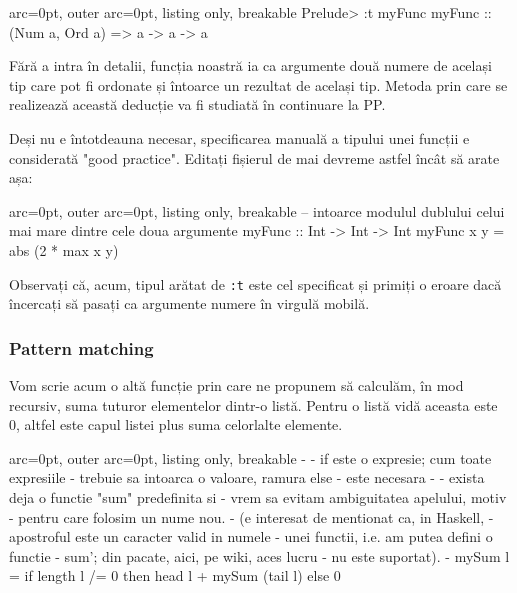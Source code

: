 \begin{tcblisting}{ arc=0pt, outer arc=0pt, listing only, breakable}
Prelude> :t myFunc
myFunc :: (Num a, Ord a) => a -> a -> a

\end{tcblisting}


Fără a intra în detalii, funcția noastră ia ca argumente două numere de același tip care pot fi ordonate și întoarce un rezultat de același tip. Metoda prin care se realizează această deducție va fi studiată în continuare la PP.

\begin{tcolorbox}[colback=blue!10, colframe=blue!20]
Deși nu e întotdeauna necesar, specificarea manuală a tipului unei funcții e considerată "good practice". Editați fișierul de mai devreme astfel încât să arate așa:


\begin{tcblisting}{ arc=0pt, outer arc=0pt, listing only, breakable}
-- intoarce modulul dublului celui mai mare dintre cele doua argumente
myFunc :: Int -> Int -> Int
myFunc x y = abs (2 * max x y)

\end{tcblisting}


Observați că, acum, tipul arătat de \texttt{:t} este cel specificat și primiți o eroare dacă încercați să pasați ca argumente numere în virgulă mobilă.
\end{tcolorbox}


\subsubsection*{ Pattern matching }

Vom scrie acum o altă funcție prin care ne propunem să calculăm, în mod recursiv, suma tuturor elementelor dintr-o listă. Pentru o listă vidă aceasta este 0, altfel este capul listei plus suma celorlalte elemente.


\begin{tcblisting}{ arc=0pt, outer arc=0pt, listing only, breakable}
{-
 - if este o expresie; cum toate expresiile
 - trebuie sa intoarca o valoare, ramura else
 - este necesara
 -
 - exista deja o functie "sum" predefinita si
 - vrem sa evitam ambiguitatea apelului, motiv
 - pentru care folosim un nume nou.
 - (e interesat de mentionat ca, in Haskell,
 - apostroful este un caracter valid in numele
 - unei functii, i.e. am putea defini o functie
 - sum'; din pacate, aici, pe wiki, aces lucru
 - nu este suportat).
 -}
mySum l = if length l /= 0
	  then head l + mySum (tail l)
	  else 0

\end{tcblisting}


